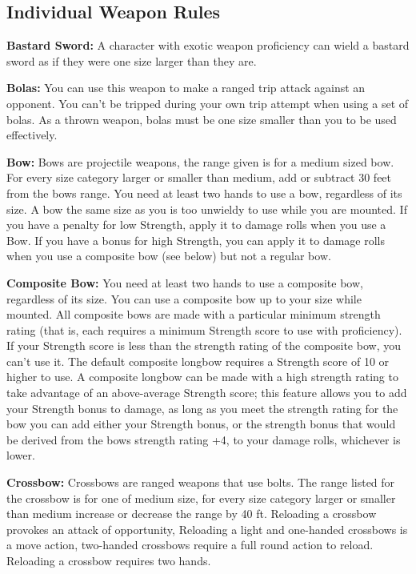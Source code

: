 \subsection{Individual Weapon Rules}

\textbf{Bastard Sword:} A character with exotic weapon proficiency can wield a bastard sword as if they were one size larger than they are.

\textbf{Bolas:} You can use this weapon to make a ranged trip attack against an opponent. You can't be tripped during your own trip attempt when using a set of bolas. As a thrown weapon, bolas must be one size smaller than you to be used effectively.

\textbf{Bow:} Bows are projectile weapons, the range given is for a medium sized bow. For every size category larger or smaller than medium, add or subtract 30 feet from the bows range. You need at least two hands to use a bow, regardless of its size. A bow the same size as you is too unwieldy to use while you are mounted. If you have a penalty for low Strength, apply it to damage rolls when you use a Bow. If you have a bonus for high Strength, you can apply it to damage rolls when you use a composite bow (see below) but not a regular bow.

\textbf{Composite Bow:} You need at least two hands to use a composite bow, regardless of its size. You can use a composite bow up to your size while mounted. All composite bows are made with a particular minimum strength rating (that is, each requires a minimum Strength score to use with proficiency). If your Strength score is less than the strength rating of the composite bow, you can't use it. The default composite longbow requires a Strength score of 10 or higher to use. A composite longbow can be made with a high strength rating to take advantage of an above-average Strength score; this feature allows you to add your Strength bonus to damage, as long as you meet the strength rating for the bow you can add either your Strength bonus, or the strength bonus that would be derived from the bows strength rating +4, to your damage rolls, whichever is lower.

\textbf{Crossbow:} Crossbows are ranged weapons that use bolts. The range listed for the crossbow is for one of medium size, for every size category larger or smaller than medium increase or decrease the range by 40 ft. Reloading a crossbow provokes an attack of opportunity, Reloading a light and one-handed crossbows is a move action, two-handed crossbows require a full round action to reload. Reloading a crossbow requires two hands.

